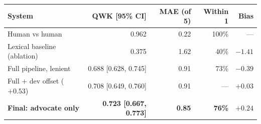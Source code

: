 \begin{tabular}{lrrrr}
\toprule
System & QWK [95\% CI] & MAE (of 5) & Within 1 & Bias \\
\midrule
Human vs human & 0.962 & 0.22 & 100\% & --- \\
Lexical baseline (ablation) & 0.375 & 1.62 & 40\% & $-1.41$ \\
Full pipeline, lenient & 0.688 [0.628, 0.745] & 0.91 & 73\% & $-0.39$ \\
Full + dev offset ($+0.53$) & 0.708 [0.649, 0.760] & 0.91 & --- & $+0.03$ \\
\textbf{Final: advocate only} & \textbf{0.723 [0.667, 0.773]} & \textbf{0.85} & \textbf{76\%} & $+0.24$ \\
\bottomrule
\end{tabular}
